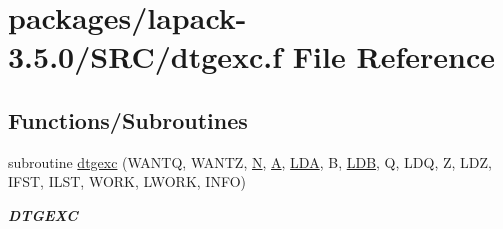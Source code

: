 \hypertarget{dtgexc_8f}{}\section{packages/lapack-\/3.5.0/\+S\+R\+C/dtgexc.f File Reference}
\label{dtgexc_8f}
\subsection*{Functions/\+Subroutines}
\begin{DoxyCompactItemize}
\item 
subroutine \hyperlink{group__doubleGEcomputational_ga2510d68d70194719d570cbcfe24b3e74}{dtgexc} (W\+A\+N\+T\+Q, W\+A\+N\+T\+Z, \hyperlink{polmisc_8c_a0240ac851181b84ac374872dc5434ee4}{N}, \hyperlink{classA}{A}, \hyperlink{example__user_8c_ae946da542ce0db94dced19b2ecefd1aa}{L\+D\+A}, B, \hyperlink{example__user_8c_a50e90a7104df172b5a89a06c47fcca04}{L\+D\+B}, Q, L\+D\+Q, Z, L\+D\+Z, I\+F\+S\+T, I\+L\+S\+T, W\+O\+R\+K, L\+W\+O\+R\+K, I\+N\+F\+O)
\begin{DoxyCompactList}\small\item\em {\bfseries D\+T\+G\+E\+X\+C} \end{DoxyCompactList}\end{DoxyCompactItemize}
